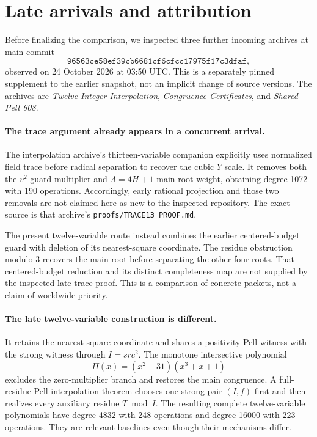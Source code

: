 \section{Late arrivals and attribution}
\label{sec:wave13-late-intake}

Before finalizing the comparison, we inspected three further incoming
archives at main commit
\[
\texttt{96563ce58ef39cb6681cf6cfcc17975f17c3dfaf},
\]
observed on 24 October 2026 at 03:50 UTC.  This is a separately pinned
supplement to the earlier snapshot, not an implicit change of source
versions.  The archives are \emph{Twelve Integer Interpolation},
\emph{Congruence Certificates}, and \emph{Shared Pell 608}.

\paragraph{The trace argument already appears in a concurrent arrival.}
The interpolation archive's thirteen-variable companion explicitly
uses normalized field trace before radical separation to recover the
cubic $Y$ scale.  It removes both the $v^2$ guard multiplier and
$\Lambda=4H+1$ main-root weight, obtaining degree 1072 with 190
operations.  Accordingly, early rational projection and those two
removals are not claimed here as new to the inspected repository.
The exact source is that archive's
\texttt{proofs/TRACE13\_PROOF.md}.

The present twelve-variable route instead combines the earlier
centered-budget guard with deletion of its nearest-square coordinate.
The residue obstruction modulo 3 recovers the main root before
separating the other four roots.  That centered-budget reduction and
its distinct completeness map are not supplied by the inspected late
trace proof.  This is a comparison of concrete packets, not a claim
of worldwide priority.

\paragraph{The late twelve-variable construction is different.}
It retains the nearest-square coordinate and shares a positivity
Pell witness with the strong witness through $I=src^2$.
The monotone intersective polynomial
\[
\Pi(x)=(x^2+31)(x^3+x+1)
\]
excludes the zero-multiplier branch and restores the main congruence.
A full-residue Pell interpolation theorem chooses one strong pair
$(I,f)$ first and then realizes every auxiliary residue $T\bmod I$.
The resulting complete twelve-variable polynomials have
degree 4832 with 248 operations and degree 16000 with 223 operations.
They are relevant baselines even though their mechanisms differ.

